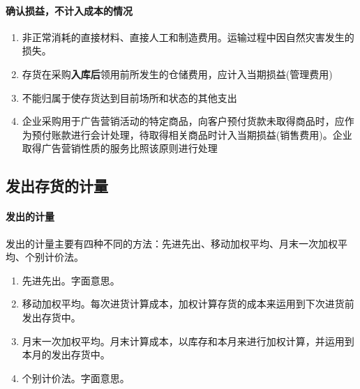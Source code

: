 \documentclass[UTF8,12pt]{ctexart}
\numberwithin{equation}{section} %
\numberwithin{figure}{section}
\numberwithin{table}{section}
\begin{document}
	\paragraph{确认损益，不计入成本的情况}
	\begin{enumerate}
		\item 非正常消耗的直接材料、直接人工和制造费用。运输过程中因自然灾害发生的损失。
		
		\item 存货在采购\textbf{入库后}领用前所发生的仓储费用，应计入当期损益(管理费用)
		
		\item 不能归属于使存货达到目前场所和状态的其他支出
		
		\item 企业采购用于广告营销活动的特定商品，向客户预付货款未取得商品时，应作为预付账款进行会计处理，待取得相关商品时计入当期损益(销售费用)。企业取得广告营销性质的服务比照该原则进行处理 
	\end{enumerate}
	
	\subsection{发出存货的计量}
	\paragraph{发出的计量} 发出的计量主要有四种不同的方法：先进先出、移动加权平均、月末一次加权平均、个别计价法。
	\begin{enumerate}
		\item 先进先出。字面意思。
		
		\item 移动加权平均。每次进货计算成本，加权计算存货的成本来运用到下次进货前发出存货中。
		
		\item 月末一次加权平均。月末计算成本，以库存和本月来进行加权计算，并运用到本月的发出存货中。
		
		\item 个别计价法。字面意思。
	\end{enumerate}
	
\end{document}
